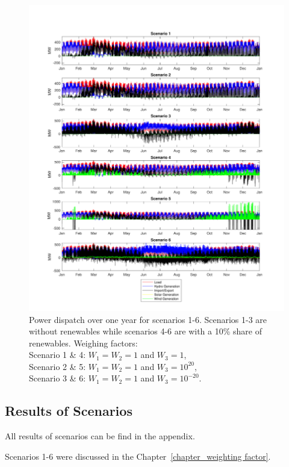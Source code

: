 \begin{figure}
    \centering
    \includegraphics[width=\textwidth]{figures/Results/power_dispatch_scenario_123456.pdf}
    \caption{Power dispatch over one year for scenarios 1-6. Scenarios 1-3 are without renewables while scenarios 4-6 are with a 10\% share of renewables. Weighing factors: \\
    Scenario 1 \& 4: $W_1 = W_2 = 1$ and $W_3 = 1$, \\
    Scenario 2 \& 5: $W_1 = W_2 = 1$ and $W_3 = 10^{20}$, \\
    Scenario 3 \& 6: $W_1 = W_2 = 1$ and $W_3 = 10^{-20}$.}
    \label{fig:results scenario 1-6}
\end{figure}

\subsection{Results of Scenarios}
All results of scenarios can be find in the appendix. 

Scenarios 1-6 were discussed in the Chapter~\ref{chapter_weighting factor}. 

